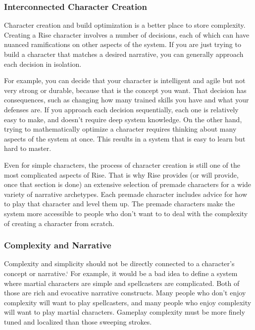     \subsubsection{Interconnected Character Creation}
      Character creation and build optimization is a better place to store complexity.
      Creating a Rise character involves a number of decisions, each of which can have nuanced ramifications on other aspects of the system.
      If you are just trying to build a character that matches a desired narrative, you can generally approach each decision in isolation.

      For example, you can decide that your character is intelligent and agile but not very strong or durable, because that is the concept you want.
      That decision has consequences, such as changing how many trained skills you have and what your defenses are.
      If you approach each decision sequentially, each one is relatively easy to make, and doesn't require deep system knowledge.
      On the other hand, trying to mathematically optimize a character requires thinking about many aspects of the system at once.
      This results in a system that is easy to learn but hard to master.

      Even for simple characters, the process of character creation is still one of the most complicated aspects of Rise.
      That is why Rise provides (or will provide, once that section is done) an extensive selection of premade characters for a wide variety of narrative archetypes.
      Each premade character includes advice for how to play that character and level them up.
      The premade characters make the system more accessible to people who don't want to to deal with the complexity of creating a character from scratch.

    \subsubsection{Complexity and Narrative}
      Complexity and simplicity should not be directly connected to a character's concept or narrative.`
      For example, it would be a bad idea to define a system where martial characters are simple and spellcasters are complicated.
      Both of those are rich and evocative narrative constructs.
      Many people who don't enjoy complexity will want to play spellcasters, and many people who enjoy complexity will want to play martial characters.
      Gameplay complexity must be more finely tuned and localized than those sweeping strokes.

